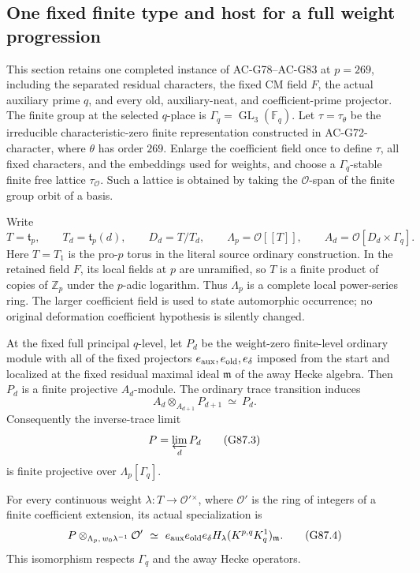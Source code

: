 \subsection{One fixed finite type and host for a full weight progression}
\label{sec:cubic-uniform-weight-type}

This section retains one completed instance of AC-G78--AC-G83 at
\(p=269\), including the separated residual characters, the fixed
CM field \(F\), the actual auxiliary prime \(q\), and every old,
auxiliary-neat, and coefficient-prime projector.
The finite group at the selected \(q\)-place is
\(\Gamma_q=\operatorname{GL}_3(\mathbb F_q)\).
Let \(\tau=\tau_\theta\) be the irreducible characteristic-zero
finite representation constructed in AC-G72-character, where
\(\theta\) has order \(269\).
Enlarge the coefficient field once to define \(\tau\), all fixed
characters, and the embeddings used for weights, and choose a
\(\Gamma_q\)-stable finite free lattice \(\tau_{\mathcal O}\).
Such a lattice is obtained by taking the \(\mathcal O\)-span of the
finite group orbit of a basis.

Write
\[
 T=\mathfrak t_p,\qquad T_d=\mathfrak t_p(d),\qquad
 D_d=T/T_d,\qquad
 \Lambda_p=\mathcal O[[T]],\qquad A_d=\mathcal O[D_d\times\Gamma_q].
 \tag{G87.1}
\]
Here \(T=T_1\) is the pro-\(p\) torus in the literal source
ordinary construction.  In the retained field \(F\), its local
fields at \(p\) are unramified, so \(T\) is a finite product of
copies of \(\mathbb Z_p\) under the \(p\)-adic logarithm.
Thus \(\Lambda_p\) is a complete local power-series ring.
The larger coefficient field is used to state automorphic occurrence;
no original deformation coefficient hypothesis is silently changed.

\begin{lemma}
\label{lem:G87-projective}
At the fixed full principal \(q\)-level, let \(P_d\) be the weight-zero
finite-level ordinary module with all of the fixed projectors
\(e_{\rm aux},e_{\rm old},e_{\delta}\) imposed from the start and
localized at the fixed residual maximal ideal \(\mathfrak m\)
of the away Hecke algebra.
Then \(P_d\) is a finite projective \(A_d\)-module.
The ordinary trace transition induces
\[
 A_d\otimes_{A_{d+1}}P_{d+1}\ \simeq\ P_d.
 \tag{G87.2}
\]
Consequently the inverse-trace limit
\[
 P=\varprojlim_d P_d
 \tag{G87.3}
\]
is finite projective over \(\Lambda_p[\Gamma_q]\).

For every continuous weight
\(\lambda:T\to\mathcal O'{}^\times\), where \(\mathcal O'\) is
the ring of integers of a finite coefficient extension, its actual
specialization is
\[
 P\otimes_{\Lambda_p,\,w_0\lambda^{-1}}\mathcal O'
 \ \simeq\
 e_{\rm aux}e_{\rm old}e_\delta
 H_\lambda(K^{p,q}K_q^1)_{\mathfrak m}.
 \tag{G87.4}
\]
This isomorphism respects \(\Gamma_q\) and the away Hecke operators.
\end{lemma}

